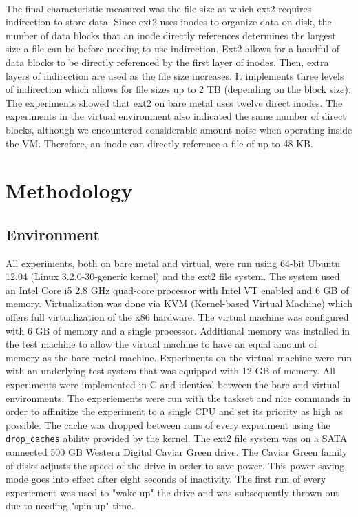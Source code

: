 \documentclass[letterpaper,twocolumn,10pt]{article}
\begin{document}
\paragraph{}
The final characteristic measured was the file size at which ext2 requires indirection to store data. 
Since ext2 uses inodes to organize data on disk, the number of data blocks that an inode directly references determines the largest size a file can be before needing to use indirection. 
Ext2 allows for a handful of data blocks to be directly referenced by the first layer of inodes. 
Then, extra layers of indirection are used as the file size increases. 
It implements three levels of indirection which allows for file sizes up to 2 TB (depending on the block size). 
The experiments showed that ext2 on bare metal uses twelve direct inodes. 
The experiments in the virtual environment also indicated the same number of direct blocks, although we encountered considerable amount noise when operating inside the VM.  
Therefore, an inode can directly reference a file of up to 48 KB.


\section{Methodology}
\subsection{Environment}
All experiments, both on bare metal and virtual, were run using 64-bit Ubuntu 12.04 (Linux 3.2.0-30-generic kernel) and the ext2 file system.
The system used an Intel Core i5 2.8 GHz quad-core processor with Intel VT enabled and 6 GB of memory.
Virtualization was done via KVM (Kernel-based Virtual Machine) which offers full virtualization of the x86 hardware.
The virtual machine was configured with 6 GB of memory and a single processor.
Additional memory was installed in the test machine to allow the virtual machine to have an equal amount of memory as the bare metal machine.
Experiments on the virtual machine were run with an underlying test system that was equipped with 12 GB of memory.
All experiments were implemented in C and identical between the bare and virtual environments. 
The experiements were run with the taskset and nice commands in order to affinitize the experiment to a single CPU and set its priority as high as possible.
The cache was dropped between runs of every experiment using the \texttt{drop\_caches} ability provided by the kernel.
The ext2 file system was on a SATA connected 500 GB Western Digital Caviar Green drive. 
The Caviar Green family of disks adjusts the speed of the drive in order to save power. 
This power saving mode goes into effect after eight seconds of inactivity.
The first run of every experiement was used to "wake up" the drive and was subsequently thrown out due to needing "spin-up" time. 
\end{document}
